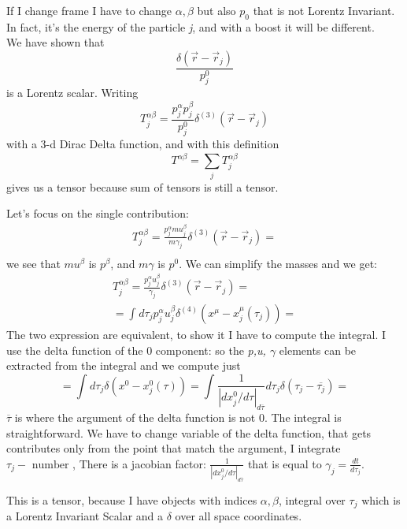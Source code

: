 If I change frame I have to change $\alpha , \beta $ but also $p_{0}$ that is not Lorentz Invariant. In fact, it's the energy of the particle \emph{j}, and with a boost it will be different.\\
We have shown that 
\[
\frac{\delta\left( \vec{r}-\vec{r}_{j} \right)}{p^{0}_{j}}
\]
is a Lorentz scalar. 
Writing
\[
T^{\alpha \beta }_{j}= \frac{p^{\alpha }_{j}p^{\beta }_{j}}{p^{0}_{j}} \delta^{\left( 3 \right)}\left( \vec{r}-\vec{r}_{j} \right) 
\]
with a 3-d Dirac Delta function, and with this definition 
\[
T^{\alpha  \beta } = \sum_{j}^{}{T^{\alpha \beta }_{j}}
\]
gives us a tensor because sum of tensors is still a tensor.

Let's focus on the single contribution:
\begin{gather*}
T^{\alpha \beta }_{j} = \frac{p^{\alpha }_{j} m u^{\beta }_{j}}{m \gamma_{j}} \delta^{\left( 3 \right)}\left( \vec{r}-\vec{r}_{j} \right) =\\
\end{gather*}
we see that $m u^{\beta }$ is $p^{\beta }$, and $m \gamma $ is $p^{0}$. We can simplify the masses and we get:
\begin{gather*}
T^{\alpha \beta }_{j} = \frac{p^{\alpha }_{j} u^{\beta }_{j}}{ \gamma_{j}} \delta^{\left( 3 \right)}\left( \vec{r}-\vec{r}_{j} \right) =\\
= \int_{}^{}{d\tau_{j} p^{\alpha }_{j} u^{\beta }_{j} \delta^{\left( 4 \right)}\left( x^{\mu }-x^{\mu }_{j}\left( \tau_{j} \right) \right)} =
\end{gather*}
The two expression are equivalent, to show it I have to compute the integral. I use the delta function of the 0 component: so the \emph{p,u, $\gamma $} elements can be extracted from the integral and we compute just
\begin{equation}
	= \int_{}^{}{d\tau_{j} \delta\left( x^{0}-x^{0}_{j}\left( \tau  \right) \right)} = \int_{}^{}{\frac{1}{\left| dx^{0}_{j}/d\tau \right|_{d\overline{\tau }}} d\tau_{j} \delta\left( \tau_{j}-\overline{\tau_{j}} \right)}= 
\end{equation}
$\overline{\tau }$ is where the argument of the delta function is not 0. The integral is straightforward. We have to change variable of the delta function, that gets contributes only from the point that match the argument, I integrate $\tau_{j} - \text{ number }$, There is a jacobian factor: $\frac{1}{\left| dx^{0}_{j}/d\tau \right|_{d\overline{\tau }}}$ that is equal to $\gamma_{j} = \frac{dt}{d\tau_{j}}$.

This is a tensor, because I have objects with indices $\alpha, \beta $, integral over $\tau_{j}$ which is a Lorentz Invariant Scalar and a $\delta $ over all space coordinates.

